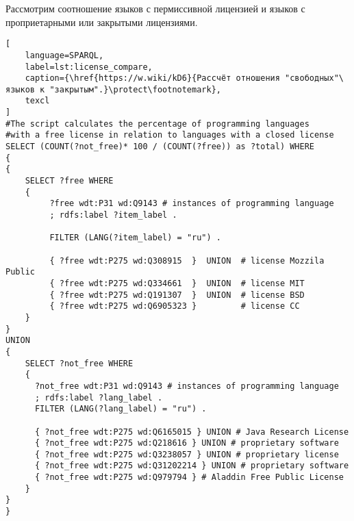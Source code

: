 Рассмотрим соотношение языков с пермиссивной лицензией и языков с проприетарными или закрытыми лицензиями.

\pagebreak

\label{question:prog_lang_2}
\begin{lstlisting}[
	language=SPARQL,
	label=lst:license_compare,
	caption={\href{https://w.wiki/kD6}{Рассчёт отношения "свободных"\ языков к "закрытым".}\protect\footnotemark},
	texcl
]
#The script calculates the percentage of programming languages 
#with a free license in relation to languages with a closed license
SELECT (COUNT(?not_free)* 100 / (COUNT(?free)) as ?total) WHERE
{ 
{
    SELECT ?free WHERE 
    {
         ?free wdt:P31 wd:Q9143 # instances of programming language
         ; rdfs:label ?item_label . 

         FILTER (LANG(?item_label) = "ru") . 
  
         { ?free wdt:P275 wd:Q308915  }  UNION  # license Mozzila Public
         { ?free wdt:P275 wd:Q334661  }  UNION  # license MIT
         { ?free wdt:P275 wd:Q191307  }  UNION  # license BSD
         { ?free wdt:P275 wd:Q6905323 }         # license CC
    }
}
UNION
{
    SELECT ?not_free WHERE 
    {
      ?not_free wdt:P31 wd:Q9143 # instances of programming language
      ; rdfs:label ?lang_label . 
      FILTER (LANG(?lang_label) = "ru") .
  
      { ?not_free wdt:P275 wd:Q6165015 } UNION # Java Research License
      { ?not_free wdt:P275 wd:Q218616 } UNION # proprietary software
      { ?not_free wdt:P275 wd:Q3238057 } UNION # proprietary license 
      { ?not_free wdt:P275 wd:Q31202214 } UNION # proprietary software 
      { ?not_free wdt:P275 wd:Q979794 } # Aladdin Free Public License
    }
}
}
\end{lstlisting}

